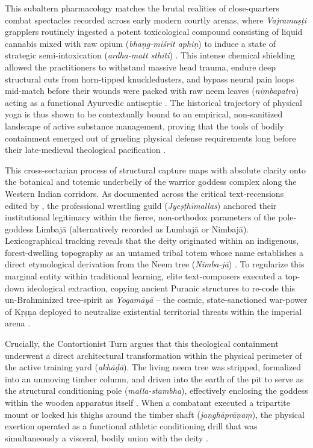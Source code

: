 \documentclass[11pt,twoside,letterpaper]{article}
\begin{document}
This subaltern pharmacology matches the brutal realities of close-quarters combat spectacles recorded across early modern courtly arenas, where \textit{Vajramuṣṭi} grapplers routinely ingested a potent toxicological compound consisting of liquid cannabis mixed with raw opium (\textit{bhaṇg-miśrit aphiṇ}) to induce a state of strategic semi-intoxication (\textit{ardha-matt sthiti}) \citep{Sandesara1948}. This intense chemical shielding allowed the practitioners to withstand massive head trauma, endure deep structural cuts from horn-tipped knuckledusters, and bypass neural pain loops mid-match before their wounds were packed with raw neem leaves (\textit{nimbapatra}) acting as a functional Ayurvedic antiseptic \citep{Sandesara1948}. The historical trajectory of physical yoga is thus shown to be contextually bound to an empirical, non-sanitized landscape of active substance management, proving that the tools of bodily containment emerged out of grueling physical defense requirements long before their late-medieval theological pacification \citep{Sandesara1948, Wujastyk2025}.

This cross-sectarian process of structural capture maps with absolute clarity onto the botanical and totemic underbelly of the warrior goddess complex along the Western Indian corridors. As documented across the critical text-recensions edited by \citet{MP_7}, the professional wrestling guild (\textit{Jyeṣṭhīmallas}) anchored their institutional legitimacy within the fierce, non-orthodox parameters of the pole-goddess Limbajā (alternatively recorded as Lumbajā or Nimbajā). Lexicographical tracking reveals that the deity originated within an indigenous, forest-dwelling topography as an untamed tribal totem whose name establishes a direct etymological derivation from the Neem tree (\textit{Nimba-jā}) \citep{Abbasi2001, Sandesara1948}. To regularize this marginal entity within traditional learning, elite text-composers executed a top-down ideological extraction, copying ancient Puranic structures to re-code this un-Brahminized tree-spirit as \textit{Yogamāyā} -- the cosmic, state-sanctioned war-power of Kṛṣṇa deployed to neutralize existential territorial threats within the imperial arena \citep{Das1968, Sandesara1948}.

Crucially, the Contortionist Turn argues that this theological containment underwent a direct architectural transformation within the physical perimeter of the active training yard (\textit{akhāḍā}). The living neem tree was stripped, formalized into an unmoving timber column, and driven into the earth of the pit to serve as the structural conditioning pole (\textit{malla-stambha}), effectively enclosing the goddess within the wooden apparatus itself \citep{MP_7, Khasgivale1929}. When a combatant executed a tripartite mount or locked his thighs around the timber shaft (\textit{jaṇghāprāṇaṃ}), the physical exertion operated as a functional athletic conditioning drill that was simultaneously a visceral, bodily union with the deity \citep{MP_7}. 
\end{document}

